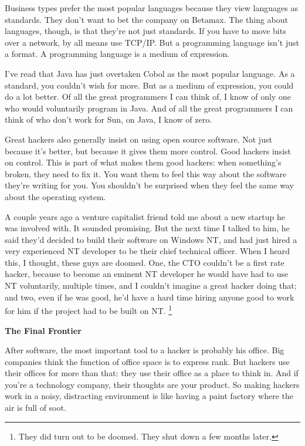 \documentclass[12pt]{book}
\begin{document}
Business types prefer the most popular languages because they view
languages as standards. They don't want to bet the company on Betamax.
The thing about languages, though, is that they're not just standards.
If you have to move bits over a network, by all means use TCP/IP. But a
programming language isn't just a format. A programming language is a
medium of expression.

I've read that Java has just overtaken Cobol as the most popular
language. As a standard, you couldn't wish for more. But as a medium of
expression, you could do a lot better. Of all the great programmers I
can think of, I know of only one who would voluntarily program in Java.
And of all the great programmers I can think of who don't work for Sun,
on Java, I know of zero.

Great hackers also generally insist on using open source software. Not
just because it's better, but because it gives them more control. Good
hackers insist on control. This is part of what makes them good hackers:
when something's broken, they need to fix it. You want them to feel this
way about the software they're writing for you. You shouldn't be
surprised when they feel the same way about the operating system.

A couple years ago a venture capitalist friend told me about a new
startup he was involved with. It sounded promising. But the next time I
talked to him, he said they'd decided to build their software on Windows
NT, and had just hired a very experienced NT developer to be their chief
technical officer. When I heard this, I thought, these guys are doomed.
One, the CTO couldn't be a first rate hacker, because to become an
eminent NT developer he would have had to use NT voluntarily, multiple
times, and I couldn't imagine a great hacker doing that; and two, even
if he was good, he'd have a hard time hiring anyone good to work for him
if the project had to be built on NT. \footnote{They did turn out to be doomed. They shut down a few months
later.}

\textbf{The Final Frontier}

After software, the most important tool to a hacker is probably his
office. Big companies think the function of office space is to express
rank. But hackers use their offices for more than that: they use their
office as a place to think in. And if you're a technology company, their
thoughts are your product. So making hackers work in a noisy,
distracting environment is like having a paint factory where the air is
full of soot.
\end{document}

